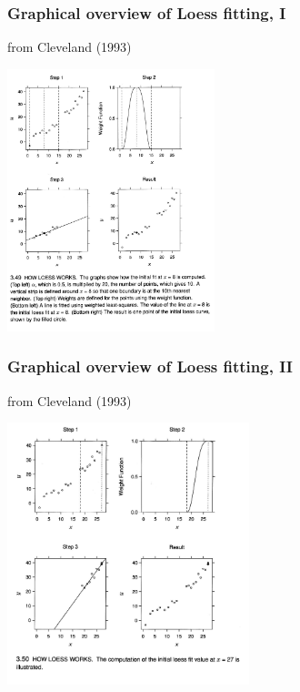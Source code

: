 \documentclass{beamer}
\begin{document}
\begin{frame}
  \frametitle{Graphical overview of Loess fitting, I}  

{\tiny from Cleveland (1993)}
\begin{center}
\includegraphics[height=3in]{loess1.pdf}
\end{center}  

\end{frame}

\begin{frame}
  \frametitle{Graphical overview of Loess fitting, II}  

{\tiny from Cleveland (1993)}
\begin{center}
\includegraphics[height=3in]{loess2.pdf}
\end{center}  

\end{frame}
\end{document}
